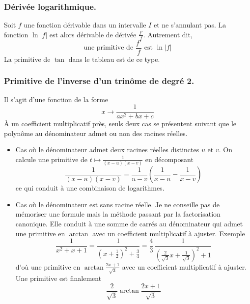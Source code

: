   
\subsubsection{Dérivée logarithmique.} 
Soit $f$ une fonction dérivable dans un intervalle $I$ et ne s'annulant pas. La fonction $\ln|f|$ est alors dérivable de dérivée $\frac{f'}{f}$. Autrement dit,
\begin{displaymath}
  \text{une primitive de }\frac{f'}{f} \text{ est }\ln|f|
\end{displaymath}
La primitive de $\tan$ dans le tableau est de ce type.

\subsubsection{Primitive de l'inverse d'un trinôme de degré 2.}
Il s'agit d'une fonction de la forme 
\begin{displaymath}
 x\rightarrow\frac{1}{ax^2+bx+c} 
\end{displaymath}
\`A un coefficient multiplicatif près, seuls deux cas se présentent suivant que le polynôme au dénominateur admet ou non des racines réelles.
\begin{itemize}
  \item Cas où le dénominateur admet deux racines réelles distinctes $u$ et $v$.\newline
  On calcule une primitive de
  $t \mapsto \frac{1}{(x-u)(x-v)}$ en décomposant
  \begin{displaymath}
    \frac{1}{(x-u)(x-v)} = \frac{1}{u-v}\left( \frac{1}{x-u} - \frac{1}{x-v}\right) 
  \end{displaymath}
ce qui conduit à une combinaison de logarithmes.

  \item Cas où le dénominateur est sans racine réelle.\newline
  Je ne conseille pas de mémoriser une formule mais la méthode passant par la factorisation canonique. Elle conduit à une somme de carrés au dénominateur qui admet une primitive en $\arctan$ avec un coefficient multiplicatif à ajuster.\newline
  Exemple
\begin{displaymath}
  \frac{1}{x^2 + x + 1}=\frac{1}{(x+\frac{1}{2})^2+\frac{3}{4}}=\frac{4}{3}\,\frac{1}{(\frac{2}{\sqrt{3}}x+\frac{1}{\sqrt{3}})^2+1}
\end{displaymath}
d'où une primitive en $\arctan\frac{2x+1}{\sqrt{3}}$ avec un coefficient multiplicatif à ajuster. Une primitive est finalement
\begin{displaymath}
  \frac{2}{\sqrt{3}}\arctan\frac{2x+1}{\sqrt{3}}
\end{displaymath}

\end{itemize}

